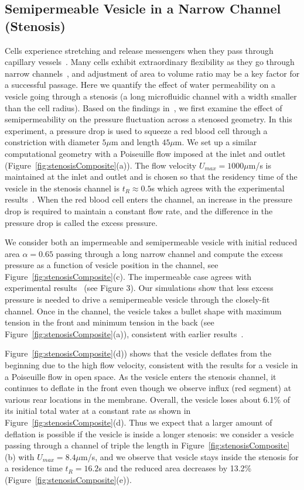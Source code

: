 \documentclass[9pt,twocolumn,twoside,lineno]{pnas-new}
\begin{document}
\subsection*{Semipermeable Vesicle in a Narrow Channel (Stenosis)}
Cells experience stretching and release messengers when they pass
through capillary vessels~\cite{Wan2008_PNAS, ForsythWan2011_PNAS,
Pak2015_PNAS}.  Many cells exhibit extraordinary flexibility as they go
through narrow channels~\cite{AuStoreyMoore2016_PNAS}, and adjustment of
area to volume ratio may be a key factor for a successful passage.  Here
we quantify the effect of water permeability on a vesicle going through
a stenosis (a long microfluidic channel with a width smaller than the
cell radius).  Based on the findings in~\cite{abk-fai-sto2006}, we first
examine the effect of semipermeability on the pressure fluctuation
across a stenosed geometry. In this experiment, a pressure drop is used
to squeeze a red blood cell through a constriction with diameter $5\mu$m
and length $45\mu$m. We set up a similar computational geometry with a
Poiseuille flow imposed at the inlet and outlet
(Figure~\ref{fig:stenosisComposite}(a)). The flow velocity $U_{max} =
1000 \mu$m/s is maintained at the inlet and outlet and is chosen so that the residency time of the vesicle in the
stenosis channel is $t_R \approx 0.5$s which agrees with the
experimental results~\cite{abk-fai-sto2006}. When the red blood cell
enters the channel, an increase in the pressure drop is required to
maintain a constant flow rate, and the difference in the pressure drop
is called the excess pressure. 

We consider both an impermeable and semipermeable vesicle with initial
reduced area $\alpha = 0.65$ passing through a long narrow channel and
compute the excess pressure as a function of vesicle position in the
channel, see Figure~\ref{fig:stenosisComposite}(c). The impermeable case
agrees with experimental results~\cite{abk-fai-sto2006} (see Figure 3).
Our simulations show that less excess pressure is needed to drive a
semipermeable vesicle through the closely-fit channel. Once in the
channel, the vesicle takes a bullet shape with maximum tension in the
front and minimum tension in the back (see
Figure~\ref{fig:stenosisComposite}(a)), consistent with earlier
results~\cite{Pak2015_PNAS, HarmanBertrandJoos2017_CJP}.

Figure~\ref{fig:stenosisComposite}(d)) shows that the vesicle deflates
from the beginning due to the high flow velocity, consistent with the
results for a vesicle in a Poiseuille flow in open space. As the vesicle
enters the stenosis channel, it continues to deflate in the front even
though we observe influx (red segment) at various rear locations in the
membrane. Overall, the vesicle loses about 6.1\% of its initial total
water at a constant rate as shown in
Figure~\ref{fig:stenosisComposite}(d). Thus we expect that a larger
amount of deflation is possible if the vesicle is inside a longer
stenosis: we consider a vesicle passing through a channel of triple the
length in Figure~\ref{fig:stenosisComposite}(b) with $U_{max}=8.4
\mu$m/s, and we observe that vesicle stays inside the stenosis for a
residence time $t_R=16.2$s and the reduced area decreases by 13.2\%
(Figure~\ref{fig:stenosisComposite}(e)).
\end{document}
